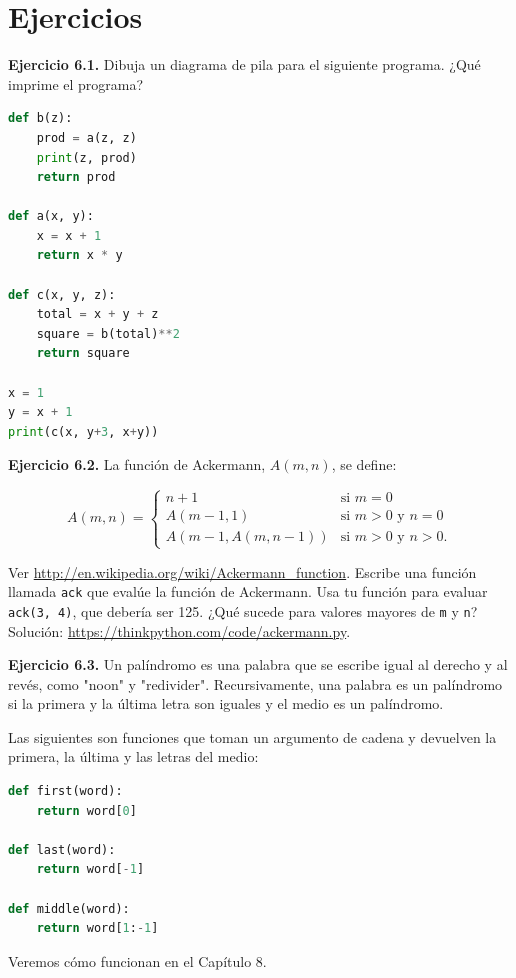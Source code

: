 \section{Ejercicios}

\textbf{Ejercicio 6.1.} Dibuja un diagrama de pila para el siguiente programa. ¿Qué imprime el programa?

\begin{lstlisting}[language=Python]
def b(z):
    prod = a(z, z)
    print(z, prod)
    return prod

def a(x, y):
    x = x + 1
    return x * y

def c(x, y, z):
    total = x + y + z
    square = b(total)**2
    return square

x = 1
y = x + 1
print(c(x, y+3, x+y))
\end{lstlisting}

\textbf{Ejercicio 6.2.} La función de Ackermann, $A(m, n)$, se define:

\[
A(m, n) =\begin{cases}n+1&\text{si }m=0\\A(m-1,1)&\text{si }m>0\text{ y }n=0\\A(m-1,A(m,n-1))&\text{si }m>0\text{ y }n>0.\end{cases}
\]

Ver \url{http://en.wikipedia.org/wiki/Ackermann_function}. Escribe una función llamada \texttt{ack} que evalúe la función de Ackermann. Usa tu función para evaluar \texttt{ack(3, 4)}, que debería ser 125. ¿Qué sucede para valores mayores de \texttt{m} y \texttt{n}? Solución: \url{https://thinkpython.com/code/ackermann.py}.

\textbf{Ejercicio 6.3.} Un palíndromo es una palabra que se escribe igual al derecho y al revés, como "noon" y "redivider". Recursivamente, una palabra es un palíndromo si la primera y la última letra son iguales y el medio es un palíndromo.

Las siguientes son funciones que toman un argumento de cadena y devuelven la primera, la última y las letras del medio:

\begin{lstlisting}[language=Python]
def first(word):
    return word[0]

def last(word):
    return word[-1]

def middle(word):
    return word[1:-1]
\end{lstlisting}

Veremos cómo funcionan en el Capítulo 8.

